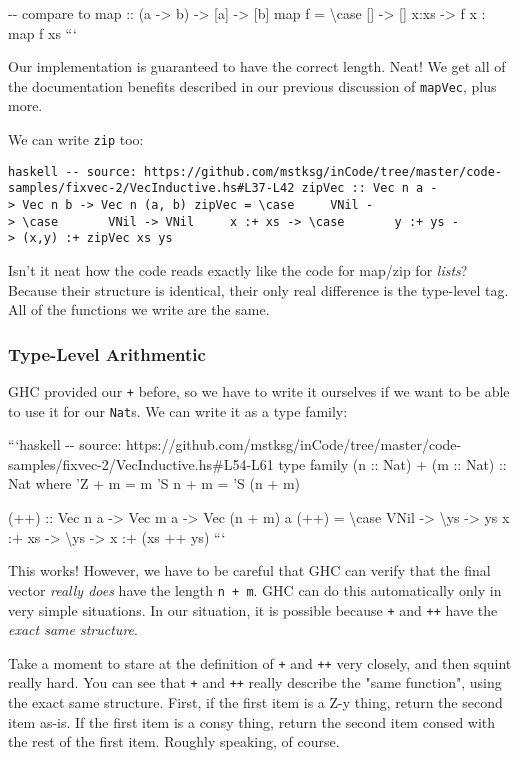 \documentclass[]{article}
\begin{document}
-\/- compare to map :: (a -\textgreater{} b) -\textgreater{} {[}a{]}
-\textgreater{} {[}b{]} map f = \textbackslash{}case {[}{]} -\textgreater{}
{[}{]} x:xs -\textgreater{} f x : map f xs ```

Our implementation is guaranteed to have the correct length. Neat! We get all of
the documentation benefits described in our previous discussion of
\texttt{mapVec}, plus more.

We can write \texttt{zip} too:

\texttt{haskell\ -\/-\ source:\ https://github.com/mstksg/inCode/tree/master/code-samples/fixvec-2/VecInductive.hs\#L37-L42\ zipVec\ ::\ Vec\ n\ a\ -\textgreater{}\ Vec\ n\ b\ -\textgreater{}\ Vec\ n\ (a,\ b)\ zipVec\ =\ \textbackslash{}case\ \ \ \ \ VNil\ -\textgreater{}\ \textbackslash{}case\ \ \ \ \ \ \ VNil\ -\textgreater{}\ VNil\ \ \ \ \ x\ :+\ xs\ -\textgreater{}\ \textbackslash{}case\ \ \ \ \ \ \ y\ :+\ ys\ -\textgreater{}\ (x,y)\ :+\ zipVec\ xs\ ys}

Isn't it neat how the code reads exactly like the code for map/zip for
\emph{lists}? Because their structure is identical, their only real difference
is the type-level tag. All of the functions we write are the same.

\subsubsection{Type-Level Arithmentic}

GHC provided our \texttt{+} before, so we have to write it ourselves if we want
to be able to use it for our \texttt{Nat}s. We can write it as a type family:

```haskell -\/- source:
https://github.com/mstksg/inCode/tree/master/code-samples/fixvec-2/VecInductive.hs\#L54-L61
type family (n :: Nat) + (m :: Nat) :: Nat where 'Z + m = m 'S n + m = 'S (n +
m)

(++) :: Vec n a -\textgreater{} Vec m a -\textgreater{} Vec (n + m) a (++) =
\textbackslash{}case VNil -\textgreater{} \textbackslash{}ys -\textgreater{} ys
x :+ xs -\textgreater{} \textbackslash{}ys -\textgreater{} x :+ (xs ++ ys) ```

This works! However, we have to be careful that GHC can verify that the final
vector \emph{really does} have the length \texttt{n\ +\ m}. GHC can do this
automatically only in very simple situations. In our situation, it is possible
because \texttt{+} and \texttt{++} have the \emph{exact same structure}.

Take a moment to stare at the definition of \texttt{+} and \texttt{++} very
closely, and then squint really hard. You can see that \texttt{+} and
\texttt{++} really describe the "same function", using the exact same structure.
First, if the first item is a Z-y thing, return the second item as-is. If the
first item is a consy thing, return the second item consed with the rest of the
first item. Roughly speaking, of course.
\end{document}
